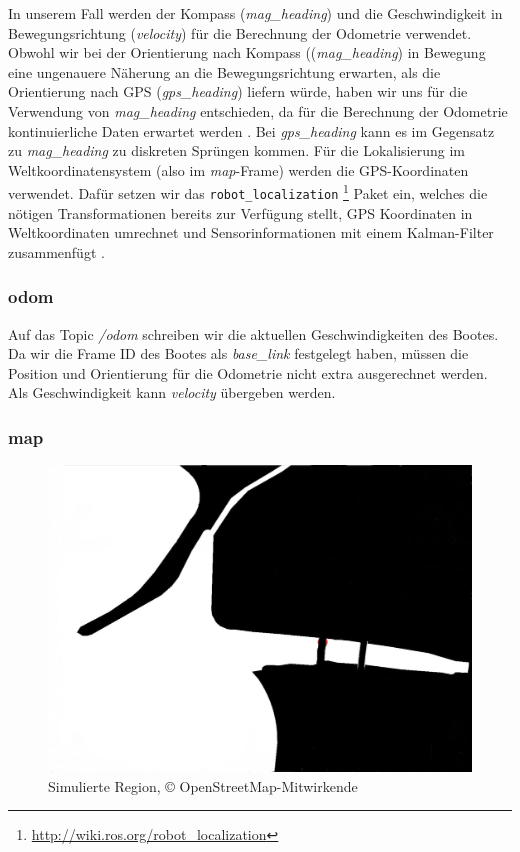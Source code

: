 \documentclass[conference]{IEEEtran}
\begin{document}
In unserem Fall werden der Kompass (\textit{mag\_heading}) und die Geschwindigkeit in Bewegungsrichtung (\textit{velocity}) für die Berechnung der Odometrie verwendet. Obwohl wir bei der Orientierung nach Kompass ((\textit{mag\_heading}) in Bewegung eine ungenauere Näherung an die Bewegungsrichtung erwarten, als die Orientierung nach GPS (\textit{gps\_heading}) liefern würde, haben wir uns für die Verwendung von \textit{mag\_heading} entschieden, da für die Berechnung der Odometrie kontinuierliche Daten erwartet werden \cite{REP105}. Bei \textit{gps\_heading} kann es im Gegensatz zu \textit{mag\_heading} zu diskreten Sprüngen kommen. Für die Lokalisierung im Weltkoordinatensystem (also im  \textit{map}-Frame) werden die GPS-Koordinaten verwendet. Dafür setzen wir das \texttt{robot\_localization} \footnote{\url{http://wiki.ros.org/robot_localization}} Paket ein, welches die nötigen Transformationen bereits zur Verfügung stellt, GPS Koordinaten in Weltkoordinaten umrechnet und Sensorinformationen mit einem Kalman-Filter zusammenfügt \cite{MooreStouchKeneralizedEkf2014}.

\subsubsection{odom}
Auf das Topic \textit{/odom} schreiben wir die aktuellen Geschwindigkeiten des Bootes. Da wir die Frame ID des Bootes als \textit{base\_link} festgelegt haben, müssen die Position und Orientierung für die Odometrie nicht extra ausgerechnet werden. Als Geschwindigkeit kann \textit{velocity} übergeben werden.

\subsubsection{map}

\begin{figure}
	\includegraphics[width=\linewidth]{diluvio.jpg}
	\caption{Simulierte Region, © OpenStreetMap-Mitwirkende}
	\label{diluvio}
\end{figure}
\end{document}
